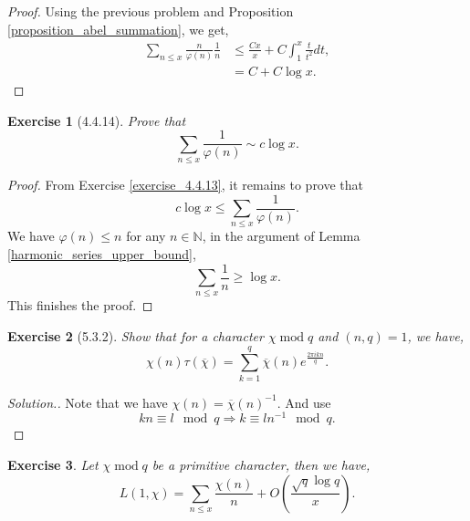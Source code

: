 \documentclass{article}
\newtheorem{exercise}{Exercise}[section]
\DeclareMathOperator{\tmod}{mod}
\newcommand{\N}[0]{\mathbb{N}}
\begin{document}
\begin{proof}
  Using the previous problem and Proposition \ref{proposition_abel_summation}, we get,
  \begin{align*}
    \sum_{n\leq x}{\frac n {\varphi(n)}}{\frac 1 n} &\leq {\frac {Cx} x}+C\int_1^x {\frac {t} {t^2}}dt,\\
    & = C+C\log x.
  \end{align*}
\end{proof}
\begin{exercise}[4.4.14]
  Prove that 
  \begin{equation*}
    \sum_{n\leq x}{\frac 1 {\varphi(n)}}\sim c\log x.
  \end{equation*}
\end{exercise}
\begin{proof}
  From Exercise \ref{exercise_4.4.13}, it remains to prove that 
  \begin{equation*}
    c\log x\leq \sum_{n\leq x}{\frac 1 {\varphi(n)}}.
  \end{equation*}
  We have $\varphi(n)\leq n$ for any $n\in\N$, in the argument of Lemma \ref{harmonic_series_upper_bound},
  \begin{equation*}
    \sum_{n\leq x}{\frac 1 n}\geq \log x.
  \end{equation*}
  This finishes the proof.
\end{proof}
\begin{exercise}[5.3.2]
  Show that for a character $\chi\tmod q$ and $(n,q)=1$, we have,
  \begin{equation*}
    \chi(n)\tau(\overline{\chi}) = \sum_{k=1}^q\overline{\chi}(n)e^{{\frac {2\pi i k n} q}}.
  \end{equation*}
\end{exercise}
\begin{proof}[Solution.]
  Note that we have $\chi(n) = \overline{\chi}(n)^{-1}$. And use 
  \begin{equation*}
    kn\equiv l\mod{q}\Rightarrow k\equiv ln^{-1}\mod{q}.
  \end{equation*}
\end{proof}
\begin{exercise}
  Let $\chi\tmod q$ be a primitive character, then we have,
  \begin{equation*}
    L(1,\chi) = \sum_{n\leq x}{\frac {\chi(n)} {n}}+O\left({\frac {\sqrt{q}\log q} {x}}\right).
  \end{equation*}
\end{exercise}
\end{document}
